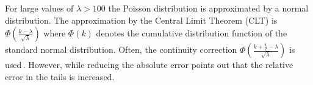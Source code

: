 \documentclass[a4paper]{scrartcl}
\begin{document}
For large values of $\lambda > 100$ the Poisson distribution is approximated by a normal distribution. The approximation by the Central Limit Theorem (CLT) is $\Phi (\frac{k - \lambda}{\sqrt{\lambda}})$ where $\Phi(k)$ denotes the cumulative distribution function of the standard normal distribution. Often, the continuity correction $\Phi (\frac{k + \frac{1}{2}- \lambda}{\sqrt{\lambda}})$ is used\,\citep{Yates1934}. However, while reducing the absolute error \citet{Molenaar1970} points out that the relative error in the tails is increased.

%    
% 
% 
% 
\end{document}
